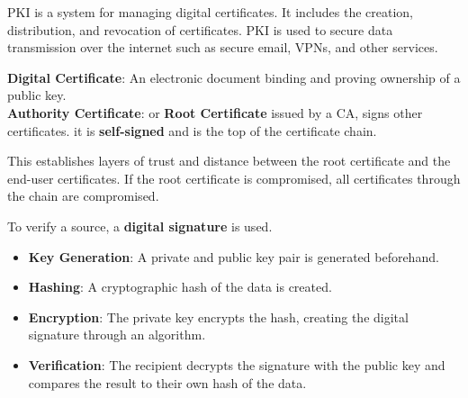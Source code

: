 \newpage 

\begin{Def}

    PKI is a system for managing digital certificates. It includes the creation, distribution, and revocation of certificates.
    PKI is used to secure data transmission over the internet such as secure email, VPNs, and other services.
    \hfill \cite{okta_pki}
\end{Def}

\begin{Def}

    \textbf{Digital Certificate}: An electronic document binding and proving ownership of a public key.\\
    \textbf{Authority Certificate}: or \textbf{Root Certificate} issued by a CA, signs other certificates.
    it is \textbf{self-signed} and is the top of the certificate chain.
    
    This establishes layers of trust and distance between the root certificate and the end-user certificates.
    If the root certificate is compromised, all certificates through the chain are compromised.
    \hfill \cite{yitzhak_digital_certificates}
\end{Def}

\begin{Def}
    
    To verify a source, a \textbf{digital signature} is used. 
    \begin{itemize}
        \item \textbf{Key Generation}: A private and public key pair is generated beforehand.
        \item \textbf{Hashing}: A cryptographic hash of the data is created.
        \item \textbf{Encryption}: The private key encrypts the hash, creating the digital signature through an algorithm.
        \item \textbf{Verification}: The recipient decrypts the signature with the public key and compares the result to their own hash of the data. \hfill \cite{cisa_digital_signatures}
    \end{itemize}
\end{Def}

